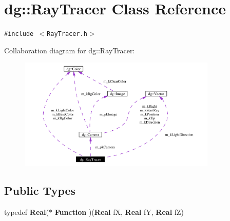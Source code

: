 \section{dg::Ray\-Tracer Class Reference}
\label{classdg_1_1RayTracer}
{\tt \#include $<$Ray\-Tracer.h$>$}

Collaboration diagram for dg::Ray\-Tracer:\begin{figure}[H]
\begin{center}
\leavevmode
\includegraphics[width=267pt]{classdg_1_1RayTracer__coll__graph}
\end{center}
\end{figure}
\subsection*{Public Types}
\begin{CompactItemize}
\item 
typedef {\bf Real}($\ast$ {\bf Function} )({\bf Real} f\-X, {\bf Real} f\-Y, {\bf Real} f\-Z)
\end{CompactItemize}
